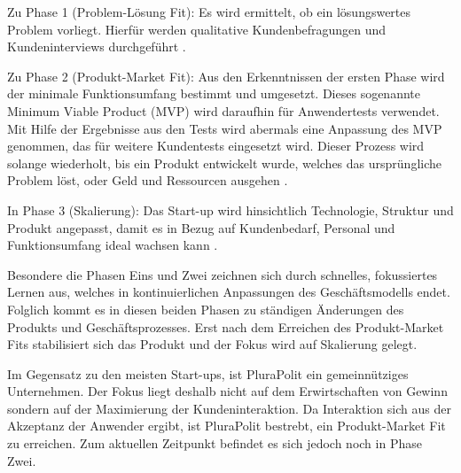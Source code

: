 Zu Phase 1 (Problem-Lösung Fit):
Es wird ermittelt, ob ein lösungswertes Problem vorliegt. Hierfür werden qualitative Kundenbefragungen und Kundeninterviews durchgeführt \parencite[vgl.][S. 170 ff.]{croll_lean_2013}.

Zu Phase 2 (Produkt-Market Fit):
 Aus den Erkenntnissen der ersten Phase wird der minimale Funktionsumfang bestimmt und umgesetzt. Dieses sogenannte Minimum Viable Product (MVP) wird daraufhin für Anwendertests verwendet. Mit Hilfe der Ergebnisse aus den Tests wird abermals eine Anpassung des MVP genommen, das für weitere Kundentests eingesetzt wird. Dieser Prozess wird solange wiederholt, bis ein Produkt entwickelt wurde, welches das ursprüngliche Problem löst, oder Geld und Ressourcen ausgehen \parencite[vgl.][S. 28]{croll_lean_2013}.

In Phase 3 (Skalierung):
Das Start-up wird hinsichtlich Technologie, Struktur und Produkt angepasst, damit es in Bezug auf Kundenbedarf, Personal und Funktionsumfang ideal wachsen kann \parencite[vgl.][S. 9]{maurya_running_2012}.

Besondere die Phasen Eins und Zwei zeichnen sich durch schnelles, fokussiertes Lernen aus, welches in kontinuierlichen Anpassungen des Geschäftsmodells endet. Folglich kommt es in diesen beiden Phasen zu ständigen Änderungen des Produkts und Geschäftsprozesses. Erst nach dem Erreichen des Produkt-Market Fits stabilisiert sich das Produkt und der Fokus wird auf Skalierung gelegt.

Im Gegensatz zu den meisten Start-ups, ist PluraPolit ein gemeinnütziges Unternehmen. Der Fokus liegt deshalb nicht auf dem Erwirtschaften von Gewinn sondern auf der Maximierung der Kundeninteraktion. Da Interaktion sich aus der Akzeptanz der Anwender ergibt, ist PluraPolit bestrebt, ein Produkt-Market Fit zu erreichen. Zum aktuellen Zeitpunkt befindet es sich jedoch noch in Phase Zwei.
